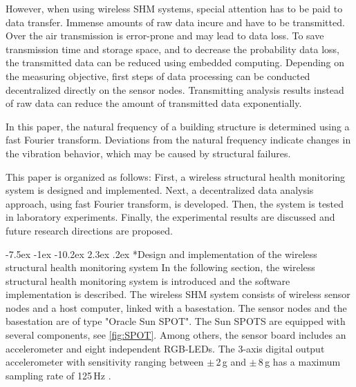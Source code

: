 \documentclass[12pt,a4paper]{scrartcl}
\makeatletter
\renewcommand\section{\@startsection{section}{1}{\z@}%
                     {-7.5ex \@plus -1ex \@minus -10.2ex}%
                     {2.3ex \@plus.2ex}%
                     {\sffamily\large\bfseries}}
\makeatother
\begin{document}
However, when using wireless SHM systems, special attention has to be paid to data transfer.
Immense amounts of raw data incure and have to be transmitted.
Over the air transmission is error-prone and may lead to data loss.
To save transmission time and storage space, and to decrease the probability data loss, the transmitted data can be reduced using embedded computing.
Depending on the measuring objective, first steps of data processing can be conducted decentralized directly on the sensor nodes.
Transmitting analysis results instead of raw data can reduce the amount of transmitted data exponentially.

In this paper, the natural frequency of a building structure is determined using a fast Fourier transform.
Deviations from the natural frequency indicate changes in the vibration behavior, which may be caused by structural failures.


This paper is organized as follows:
First, a wireless structural health monitoring system is designed and implemented. 
Next, a decentralized data analysis approach, using fast Fourier transform, is developed.
Then, the system is tested in laboratory experiments.
Finally, the experimental results are discussed and future research directions are proposed.


\section*{Design and implementation of the wireless structural health monitoring system}
In the following section, the wireless structural health monitoring system is introduced and the software implementation is described.
The wireless SHM system consists of wireless sensor nodes and a host computer, linked with a basestation.
The sensor nodes and the basestation are of type "Oracle Sun SPOT". 
The Sun SPOTS are equipped with several components, see \autoref{fig:SPOT}.
Among others, the sensor board includes an accelerometer and eight independent RGB-LEDs.
The 3-axis digital output accelerometer with sensitivity ranging between $\pm$\,2\,g and $\pm$\,8\,g has a maximum sampling rate of 125\,Hz \citep{eDemo2010}.
\end{document}
